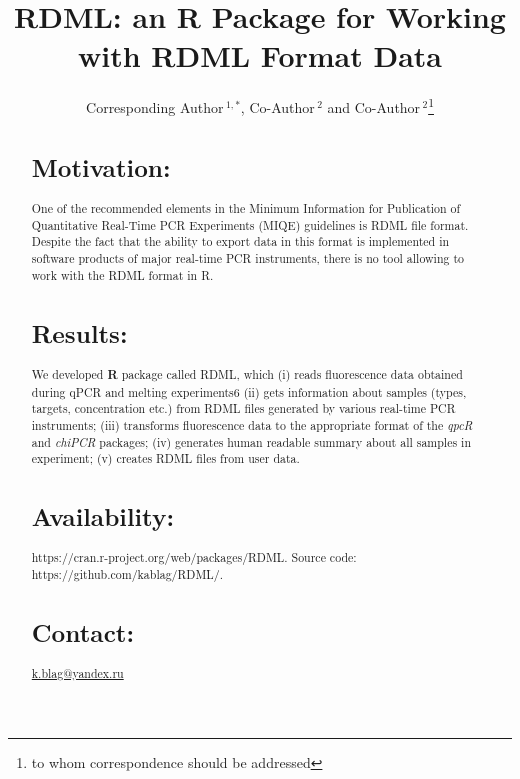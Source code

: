 \documentclass{bioinfo}
\begin{document}

\title[RDML]{RDML: an \textbf{R} Package for Working with RDML Format Data}
\author[Sample \textit{et~al}]{Corresponding Author\,$^{1,*}$, Co-Author\,$^{2}$ and Co-Author\,$^2$\footnote{to whom correspondence should be addressed}}
\address{$^{1}$Department of XXXXXXX, Address XXXX etc.\\
$^{2}$Department of XXXXXXXX, Address XXXX etc.}



\maketitle

\begin{abstract}

\section{Motivation:}
One of the recommended elements in the Minimum Information for Publication of 
Quantitative Real-Time PCR Experiments (MIQE) guidelines is RDML file format. 
Despite the fact that the ability to export data in this format is implemented 
in software products of major real-time PCR instruments, there is no tool allowing to work 
with the RDML format in R.

\section{Results:}
We developed \textbf{R} package called RDML, which (i) reads fluorescence data obtained 
during qPCR and melting experiments6 (ii) gets information about samples 
(types, targets, concentration etc.) from RDML files generated by various real-time PCR 
instruments; (iii) transforms fluorescence data to the appropriate format of the 
\textit{qpcR} and \textit{chiPCR} packages; (iv) generates human readable 
summary about all samples in experiment; (v) creates RDML files from user data. 
\section{Availability:}
https://cran.r-project.org/web/packages/RDML. Source code:
https://github.com/kablag/RDML/.
\section{Contact:} \href{k.blag@yandex.ru}{k.blag@yandex.ru}
\end{abstract}
\end{document}
